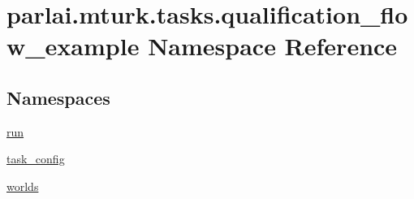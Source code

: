 \hypertarget{namespaceparlai_1_1mturk_1_1tasks_1_1qualification__flow__example}{}\section{parlai.\+mturk.\+tasks.\+qualification\+\_\+flow\+\_\+example Namespace Reference}
\label{namespaceparlai_1_1mturk_1_1tasks_1_1qualification__flow__example}
\subsection*{Namespaces}
\begin{DoxyCompactItemize}
\item 
 \hyperlink{namespaceparlai_1_1mturk_1_1tasks_1_1qualification__flow__example_1_1run}{run}
\item 
 \hyperlink{namespaceparlai_1_1mturk_1_1tasks_1_1qualification__flow__example_1_1task__config}{task\+\_\+config}
\item 
 \hyperlink{namespaceparlai_1_1mturk_1_1tasks_1_1qualification__flow__example_1_1worlds}{worlds}
\end{DoxyCompactItemize}
